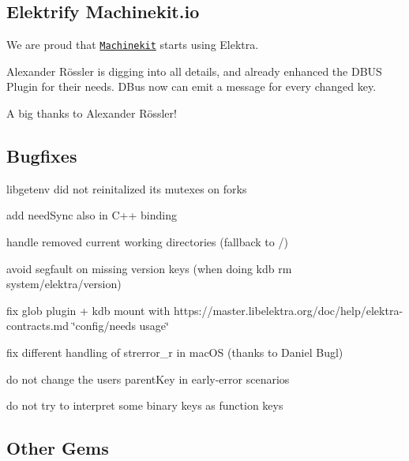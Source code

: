 \subsection*{Elektrify Machinekit.\+io}

We are proud that \href{http://www.machinekit.io/}{\tt Machinekit} starts using Elektra.

Alexander Rössler is digging into all details, and already enhanced the D\+B\+US Plugin for their needs. D\+Bus now can emit a message for every changed key.

A big thanks to Alexander Rössler!

\subsection*{Bugfixes}


\begin{DoxyItemize}
\item libgetenv did not reinitalized its mutexes on forks
\item add need\+Sync also in C++ binding
\item handle removed current working directories (fallback to /)
\item avoid segfault on missing version keys (when doing {\ttfamily kdb rm system/elektra/version})
\item fix glob plugin + kdb mount with https\+://master.libelektra.\+org/doc/help/elektra-\/contracts.md \char`\"{}config/needs usage\char`\"{}
\item fix different handling of strerror\+\_\+r in mac\+OS (thanks to Daniel Bugl)
\item do not change the users parent\+Key in early-\/error scenarios
\item do not try to interpret some binary keys as function keys
\end{DoxyItemize}

\subsection*{Other Gems}


